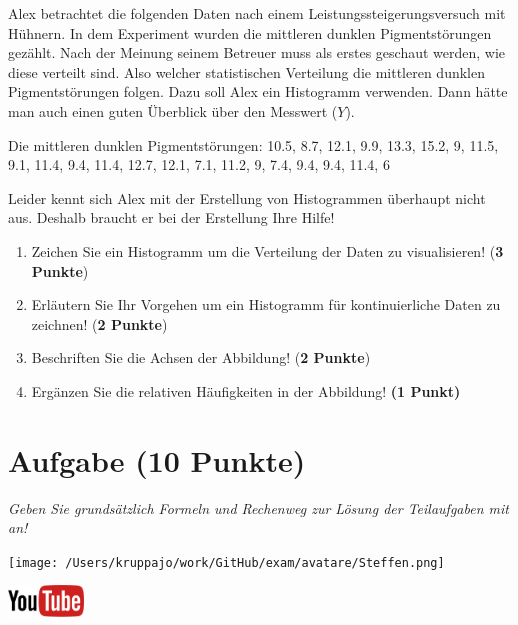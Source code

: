 \documentclass[a4paper, 9pt]{scrartcl}\usepackage[]{graphicx}\usepackage[]{xcolor}
\begin{document}
Alex betrachtet die folgenden Daten nach einem Leistungssteigerungsversuch mit Hühnern. In dem Experiment wurden die mittleren dunklen Pigmentstörungen gezählt. Nach der Meinung seinem Betreuer muss als erstes geschaut werden, wie diese verteilt sind. Also welcher statistischen Verteilung die mittleren dunklen Pigmentstörungen folgen. Dazu soll Alex ein Histogramm verwenden. Dann hätte man auch einen guten Überblick über den Messwert ($Y$).

\begin{center}
Die mittleren dunklen Pigmentstörungen: 10.5, 8.7, 12.1, 9.9, 13.3, 15.2, 9, 11.5, 9.1, 11.4, 9.4, 11.4, 12.7, 12.1, 7.1, 11.2, 9, 7.4, 9.4, 9.4, 11.4, 6
\end{center}

Leider kennt sich Alex mit der Erstellung von Histogrammen überhaupt nicht aus. Deshalb braucht er bei der Erstellung Ihre Hilfe!

\begin{enumerate}
\item Zeichen Sie ein Histogramm um die Verteilung der Daten zu
  visualisieren! (\textbf{3 Punkte})
 \item Erläutern Sie Ihr Vorgehen um ein Histogramm für kontinuierliche
  Daten zu zeichnen!  (\textbf{2 Punkte})
\item Beschriften Sie die Achsen der Abbildung! (\textbf{2 Punkte})
\item Ergänzen Sie die relativen Häufigkeiten in der Abbildung! \textbf{(1
    Punkt)}  
\end{enumerate}

 
\clearpage

\section{Aufgabe \hfill (10 Punkte)}

\textit{Geben Sie grundsätzlich Formeln und Rechenweg zur Lösung der Teilaufgaben mit an!} \\[1Ex]
 

 
\begin{minipage}[t]{0.5\textwidth}
\texttt{[image: /Users/kruppajo/work/GitHub/exam/avatare/Steffen.png]}
\end{minipage}
\begin{minipage}[t]{0.5\textwidth}
\hfill
\href{https://youtu.be/VAqiUdV4WQ0}{\includegraphics[width = 2cm]{img/youtube}}\\[1Ex]
\end{minipage}
\vspace{1ex}
\end{document}
